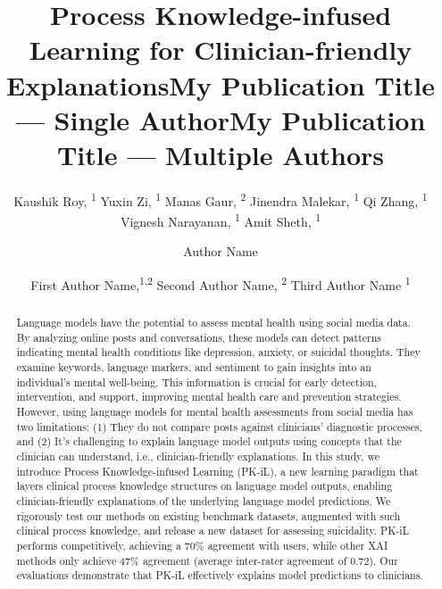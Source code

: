 \documentclass[letterpaper]{article} %
\title{Process Knowledge-infused Learning for Clinician-friendly Explanations}
\author{
    Kaushik Roy, \textsuperscript{\rm 1}
    Yuxin Zi, \textsuperscript{\rm 1}
    Manas Gaur, \textsuperscript{\rm 2} 
    Jinendra Malekar, \textsuperscript{\rm 1}
    Qi Zhang, \textsuperscript{\rm 1}
    Vignesh Narayanan, \textsuperscript{\rm 1}
    Amit Sheth, \textsuperscript{\rm 1}
}
\title{My Publication Title --- Single Author}
\author {
    Author Name
}
\title{My Publication Title --- Multiple Authors}
\author {
    First Author Name,\textsuperscript{\rm 1,\rm 2}
    Second Author Name, \textsuperscript{\rm 2}
    Third Author Name \textsuperscript{\rm 1}
}
\begin{document}
\maketitle

\begin{abstract}
Language models have the potential to assess mental health using social media data. By analyzing online posts and conversations, these models can detect patterns indicating mental health conditions like depression, anxiety, or suicidal thoughts. They examine keywords, language markers, and sentiment to gain insights into an individual's mental well-being. This information is crucial for early detection, intervention, and support, improving mental health care and prevention strategies. However, using language models for mental health assessments from social media has two limitations: (1) They do not compare posts against clinicians' diagnostic processes, and (2) It's challenging to explain language model outputs using concepts that the clinician can understand, i.e., clinician-friendly explanations. In this study, we introduce Process Knowledge-infused Learning (PK-iL), a new learning paradigm that layers clinical process knowledge structures on language model outputs, enabling clinician-friendly explanations of the underlying language model predictions. We rigorously test our methods on existing benchmark datasets, augmented with such clinical process knowledge, and release a new dataset for assessing suicidality. PK-iL performs competitively, achieving a 70\% agreement with users, while other XAI methods only achieve 47\% agreement (average inter-rater agreement of 0.72). Our evaluations demonstrate that PK-iL effectively explains model predictions to clinicians.
\end{abstract}
\end{document}
